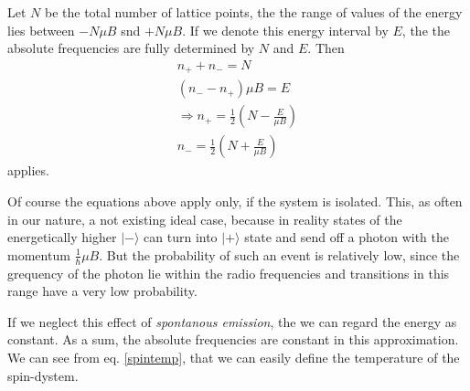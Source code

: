 \documentclass[12pt]{article}
\begin{document}
\begin{module}[id=mytemparature,uses=probability-intro]
Let $N$ be the total number of lattice points, the the range of values
of the energy lies between $-N\mu B$ snd $+N\mu B$. 
If we denote this energy interval by $E$, the the absolute frequencies
are fully determined by $N$ and $E$.
Then
\begin{eqnarray}
n_{+}+n_{-}=N\\
(n_{-}-n_{+})\mu B =E \\ 
\Rightarrow
n_{+}=\frac{1}{2}(N-\frac{E}{\mu B})\\
n_{-}=\frac{1}{2}(N+\frac{E}{\mu B})
\end{eqnarray}
applies.

Of course the equations above apply only, if the system is isolated.
This, as often in our nature, a not existing ideal case, because in 
reality states of the energetically higher $|-\rangle$ can turn into
$|+\rangle$ state and send off a photon with the 
momentum  $\frac{1}{\hbar}\mu B$. But the probability of such an event
is relatively low, since the grequency of the photon lie within the 
radio frequencies and transitions in this range have a very low
probability.

If we neglect this effect of \textsl{spontanous emission}, the we can regard 
the energy as constant. As a sum, the absolute frequencies are constant in this 
approximation. We can see from eq. \ref{spintemp}, that we can easily 
define the temperature of the spin-dystem. 


\end{module}
\end{document}
